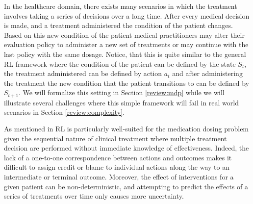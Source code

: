 In the healthcare domain, there exists many scenarios in which the treatment involves taking a series of decisions over a long time. After every medical decision is made, and a treatment administered the condition of the patient changes. Based on this new condition of the patient medical practitioners may alter their evaluation policy to administer a new set of treatments or may continue with the last policy with the same dosage. Notice, that this is quite similar to the general RL framework where the condition of the patient can be defined by the state $S_t$, the treatment administered can be defined by action $a_t$ and after administering the treatment the new condition that the patient transitions to can be defined by $S_{t+1}$. We will formalize this setting in Section \ref{review:mdp} while we will illustrate several challenges where this simple framework will fail in real world scenarios in Section \ref{review:complexity}.

	As mentioned in \citet{DBLP:conf/embc/NematiGC16} RL is particularly well-suited for the medication dosing problem given the sequential nature of clinical treatment where multiple treatment decision are performed without immediate knowledge of effectiveness. Indeed, the lack of a one-to-one correspondence between actions and outcomes makes it difficult to assign credit or blame to individual actions along the way to an intermediate or terminal outcome. Moreover, the effect of interventions for a given patient can be non-deterministic, and attempting to predict the effects of a series of treatments over time only causes more uncertainty.


